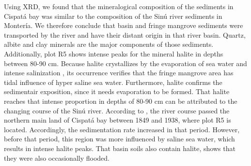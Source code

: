 Using XRD, we found that the mineralogical composition of the sediments in Cispat\'{a} bay was similar to the composition of the Sin\'{u} river sediments in Monter\'{i}a. We therefore conclude that basin and fringe mangrove sediments were transported by the river and have their distant origin in that river basin. Quartz, albite and clay minerals are the major components of those sediments. Additionally, plot R5 shows intense peaks for the mineral halite in depths between 80-90 cm. 
Because halite crystallizes by the evaporation of sea water and intense salinization \citep{McCaffrey}, its occurrence verifies that the fringe mangrove area has tidal influence of hyper saline sea water. Furthermore, halite confirms the sediment\DIFaddbegin {}\DIFaddend air exposition, since it needs evaporation to be formed. That halite reaches that intense proportion in depths of 80-90 cm can be attributed to the changing course of the Sin\'{u} river. According to \citet{suarez2004}, the river course passed \DIFaddbegin {}\DIFaddend the northern main land of Cispat\'{a} bay between 1849 and 1938, where plot R5 is located. Accordingly, the sedimentation rate increased in that period. However, before that period, this region was more influenced by saline sea water, which results in intense halite peaks. That basin soils also contain halite, shows that they were also occasionally  flooded. \par


